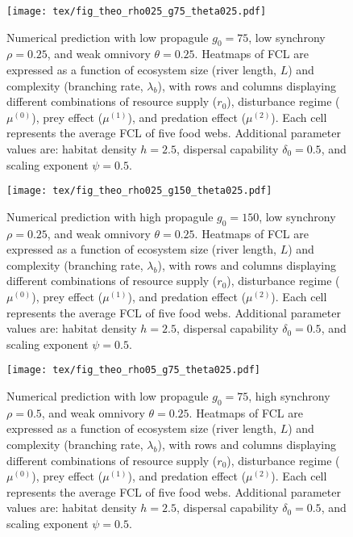 \begin{figure}
\centering
\texttt{[image: tex/fig\_theo\_rho025\_g75\_theta025.pdf]}
\caption{Numerical prediction with low propagule $g_0 = 75$, low synchrony $\rho = 0.25$, and weak omnivory $\theta = 0.25$. Heatmaps of FCL are expressed as a function of ecosystem size (river length, $L$)
and complexity (branching rate, $\lambda_b$), with rows and columns displaying
different combinations of resource supply ($r_0$), disturbance regime
($\mu^{(0)}$), prey effect ($\mu^{(1)}$), and predation effect ($\mu^{(2)}$).
Each cell represents the average FCL of five food webs.
Additional parameter values are: habitat density $h=2.5$, dispersal capability $\delta_0=0.5$, and scaling exponent $\psi=0.5$.}
\label{fig:fig-num1}
\end{figure}
\newpage

\begin{figure}
\centering
\texttt{[image: tex/fig\_theo\_rho025\_g150\_theta025.pdf]}
\caption{Numerical prediction with high propagule $g_0 = 150$, low synchrony $\rho = 0.25$, and weak omnivory $\theta = 0.25$. Heatmaps of FCL are expressed as a function of ecosystem size (river length, $L$)
and complexity (branching rate, $\lambda_b$), with rows and columns displaying
different combinations of resource supply ($r_0$), disturbance regime
($\mu^{(0)}$), prey effect ($\mu^{(1)}$), and predation effect ($\mu^{(2)}$).
Each cell represents the average FCL of five food webs.
Additional parameter values are: habitat density $h=2.5$, dispersal capability $\delta_0=0.5$, and scaling exponent $\psi=0.5$.}
\label{fig:fig-num2}
\end{figure}
\newpage

\begin{figure}
\centering
\texttt{[image: tex/fig\_theo\_rho05\_g75\_theta025.pdf]}
\caption{Numerical prediction with low propagule $g_0 = 75$, high synchrony $\rho = 0.5$, and weak omnivory $\theta = 0.25$. Heatmaps of FCL are expressed as a function of ecosystem size (river length, $L$)
and complexity (branching rate, $\lambda_b$), with rows and columns displaying
different combinations of resource supply ($r_0$), disturbance regime
($\mu^{(0)}$), prey effect ($\mu^{(1)}$), and predation effect ($\mu^{(2)}$).
Each cell represents the average FCL of five food webs.
Additional parameter values are: habitat density $h=2.5$, dispersal capability $\delta_0=0.5$, and scaling exponent $\psi=0.5$.}
\label{fig:fig-num3}
\end{figure}
\newpage

